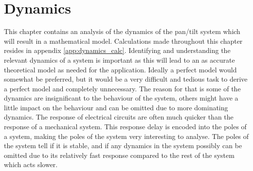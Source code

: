 \chapter{Dynamics}\label{chap:dynamics}
This chapter contains an analysis of the dynamics of the pan/tilt system which will result in a mathematical model. Calculations made throughout this chapter resides in appendix \ref{app:dynamics_calc}. Identifying and understanding the relevant dynamics of a system is important as this will lead to an as accurate theoretical model as needed for the application. Ideally a perfect model would somewhat be preferred, but it would be a very difficult and tedious task to derive a perfect model and completely unnecessary. The reason for that is some of the dynamics are insignificant to the behaviour of the system, others might have a little impact on the behaviour and can be omitted due to more dominating dynamics. The response of electrical circuits are often much quicker than the response of a mechanical system. This response delay is encoded into the poles of a system, making the poles of the system very interesting to analyse. The poles of the system tell if it is stable, and if any dynamics in the system possibly can be omitted due to its relatively fast response compared to the rest of the system which acts slower.

